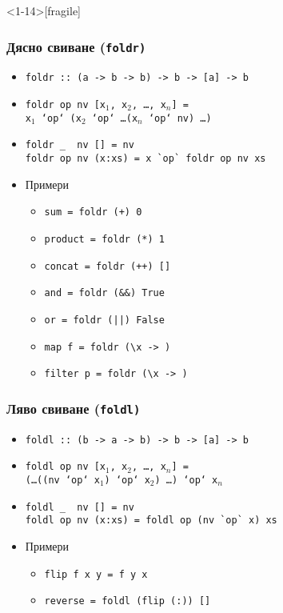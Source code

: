 \documentclass{beamer}
\begin{document}
\begin{frame}<1-14>[fragile]
  \frametitle{Дясно свиване (\tt{foldr})}
  \begin{itemize}[<+->]
  \item \tt{foldr :: (a -> b -> b) -> b -> [a] -> b}
  \item \tt{foldr op nv [x$_1$, x$_2$, \ldots, x$_n$]} = \\
    \tt{x$_1$ `op` (x$_2$ `op` \ldots (x$_n$ `op` nv) \ldots)}
  \item
\begin{verbatim}
foldr _  nv [] = nv
foldr op nv (x:xs) = x `op` foldr op nv xs
\end{verbatim}
  \item Примери
    \begin{itemize}
    \item \tt{sum = foldr (+) 0}
    \item \tt{product = foldr (*) 1}
    \item \tt{concat = foldr (++) []}
    \item \tt{and = foldr (\&\&) True}
    \item \tt{or = foldr (||) False}
    \item \tt{map f = foldr (\textbackslash x -> )}
      \onslide<+->
    \item \tt{filter p = foldr (\textbackslash x -> )}
    \end{itemize}
  \end{itemize}
\end{frame}

\begin{frame}[fragile]
  \frametitle{Ляво свиване (\tt{foldl})}
  \begin{itemize}[<+->]
  \item \tt{foldl :: (b -> a -> b) -> b -> [a] -> b}
  \item \tt{foldl op nv [x$_1$, x$_2$, \ldots, x$_n$]} = \\
    \tt{(\ldots((nv `op` x$_1$) `op` x$_2$) \ldots ) `op` x$_n$}
  \item
\begin{verbatim}
foldl _  nv [] = nv
foldl op nv (x:xs) = foldl op (nv `op` x) xs
\end{verbatim}
  \item Примери
    \begin{itemize}[<.->]
    \item \tt{flip f x y = f y x}
    \item \tt{reverse = foldl (flip (:)) []}
    \end{itemize}
  \end{itemize}
\end{frame}
\end{document}
